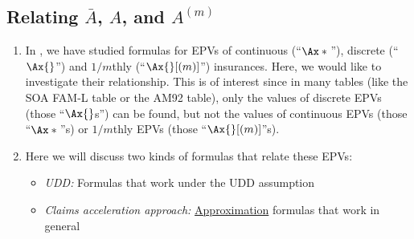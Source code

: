 \subsection{Relating \(\bar{A}\), \(A\), and \(A^{(m)}\)}
\begin{enumerate}
\item In , we have
studied formulas for EPVs of continuous (``\(\Ax*{}\)''), discrete
(``\(\Ax{}\)'') and \(1/m\)thly (``\(\Ax{}[(m)]\)'') insurances. Here, we would
like to investigate their relationship. This is of interest since in many
tables (like the SOA FAM-L table or the AM92 table), only the values of
discrete EPVs (those ``\(\Ax{}\)s'') can be found, but not the values of
continuous EPVs (those ``\(\Ax*{}\)''s) or \(1/m\)thly EPVs (those
``\(\Ax{}[(m)]\)''s).

\item Here we will discuss two kinds of formulas that relate these EPVs:
\begin{itemize}
\item \emph{UDD:} Formulas that work under the UDD assumption
\item \emph{Claims acceleration approach:} \underline{Approximation} formulas that work in general
\end{itemize}


\end{enumerate}

